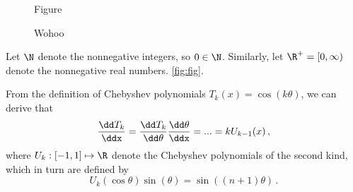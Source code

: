 \documentclass{prettytex/ox/mmsc-special-topic}
\title{\topictitle}
\author{Candidate \candidatenumber}
\date{\today}
\begin{document}
  \pagestyle{plain}
  \mmscSpecialHeader[casestudy]

  \begin{abstract}
    \label{abstract}
    This work shall attempt to
    \vspace*{0.2cm}

    \noindent
    \textbf{Our Goal:}
    Numerically obtain the solution $\{a(x, T), b(x, T)\}$ of
    \vspace*{-0.2cm}
    $$\begin{cases}
        \frac{\partial a}{\partial t} = D_a \frac{\partial^2 a}{\partial x^2}, & a: \R^+ \times [0, T] \mapsto [0, 1],\, T \in \R^+,\; D_a \in \R^+, \\[-0.2em]
        \frac{\partial b}{\partial t} = D_b \frac{\partial^2 b}{\partial x^2}, & b: \R^+ \times [0, T] \mapsto [0, 1],\, D_b \in \R^+,               \\[-0.2em]
        a(\infty, t) = 1,\; b(\infty, t) = 0                                   & \forall t \in [0, T]                                                \\[-0.2em]
        a(x, 0) = 1,\;\; b(x, 0) = 0                                           & \forall x \in (0, \infty)                                           \\[-0.2em]
        a(0, t) = 0,\; \frac{\partial a}{\partial x} + D \frac{\partial b}{\partial x} = 0
      \end{cases}$$
    \vspace*{0.05cm}

    The implementation bla bla
  \end{abstract}

  \pagebreak
  \pagestyle{normal}

  \begin{figure}[H]
    \centering
    Figure
    \caption{Wohoo}
    \label{fig:fig}
  \end{figure}

  Let $\N$ denote the nonnegative integers, so $0 \in \N$.
  Similarly, let $\R^+ = [0, \infty)$ denote the nonnegative real numbers.
  \autoref{fig:fig}.

  From the definition of Chebyshev polynomials $T_k(x) = \cos(k\theta)$, we can derive that
  $$\frac{\dd T_k}{\ddx} = \frac{\dd T_k}{\dd\theta} \frac{\dd\theta}{\ddx} = ... = k U_{k-1}(x)\,,$$
  where $U_k: [-1, 1] \mapsto \R$ denote the Chebyshev polynomials of the second kind, which in turn are defined by
  $$U_k(\cos \theta) \sin(\theta) = \sin\left((n+1) \theta\right)\,.$$
\end{document}
